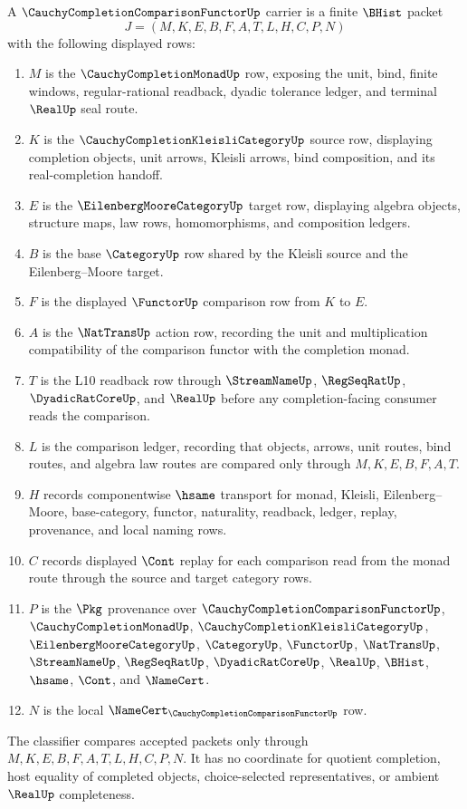 \begin{definition}
\label{def:cauchy-completion-comparison-functor-carrier}
A $\CauchyCompletionComparisonFunctorUp$ carrier is a finite $\BHist$ packet
$$
J=(M,K,E,B,F,A,T,L,H,C,P,N)
$$
with the following displayed rows:
\begin{enumerate}
\item $M$ is the $\CauchyCompletionMonadUp$ row, exposing the unit, bind, finite windows, regular-rational readback, dyadic tolerance ledger, and terminal $\RealUp$ seal route.
\item $K$ is the $\CauchyCompletionKleisliCategoryUp$ source row, displaying completion objects, unit arrows, Kleisli arrows, bind composition, and its real-completion handoff.
\item $E$ is the $\EilenbergMooreCategoryUp$ target row, displaying algebra objects, structure maps, law rows, homomorphisms, and composition ledgers.
\item $B$ is the base $\CategoryUp$ row shared by the Kleisli source and the Eilenberg--Moore target.
\item $F$ is the displayed $\FunctorUp$ comparison row from $K$ to $E$.
\item $A$ is the $\NatTransUp$ action row, recording the unit and multiplication compatibility of the comparison functor with the completion monad.
\item $T$ is the L10 readback row through $\StreamNameUp$, $\RegSeqRatUp$, $\DyadicRatCoreUp$, and $\RealUp$ before any completion-facing consumer reads the comparison.
\item $L$ is the comparison ledger, recording that objects, arrows, unit routes, bind routes, and algebra law routes are compared only through $M,K,E,B,F,A,T$.
\item $H$ records componentwise $\hsame$ transport for monad, Kleisli, Eilenberg--Moore, base-category, functor, naturality, readback, ledger, replay, provenance, and local naming rows.
\item $C$ records displayed $\Cont$ replay for each comparison read from the monad route through the source and target category rows.
\item $P$ is the $\Pkg$ provenance over $\CauchyCompletionComparisonFunctorUp$, $\CauchyCompletionMonadUp$, $\CauchyCompletionKleisliCategoryUp$, $\EilenbergMooreCategoryUp$, $\CategoryUp$, $\FunctorUp$, $\NatTransUp$, $\StreamNameUp$, $\RegSeqRatUp$, $\DyadicRatCoreUp$, $\RealUp$, $\BHist$, $\hsame$, $\Cont$, and $\NameCert$.
\item $N$ is the local $\NameCert_{\CauchyCompletionComparisonFunctorUp}$ row.
\end{enumerate}
The classifier compares accepted packets only through $M,K,E,B,F,A,T,L,H,C,P,N$. It has no coordinate for quotient completion, host equality of completed objects, choice-selected representatives, or ambient $\RealUp$ completeness.
\end{definition}

